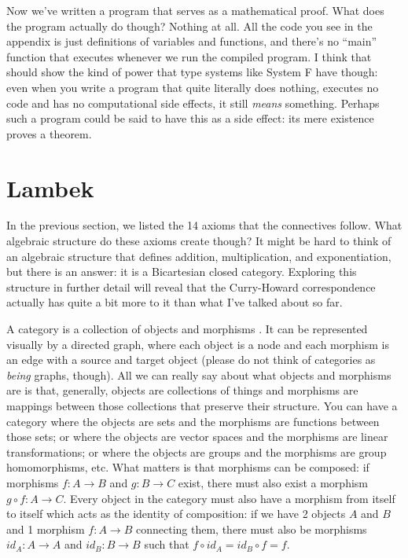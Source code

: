 \documentclass[12pt]{article}
\begin{document}
Now we've written a program that serves as a mathematical proof. What does the program actually do though? Nothing at all. All the code you see in the appendix is just definitions of variables and functions, and there's no ``main'' function that executes whenever we run the compiled program. I think that should show the kind of power that type systems like System F have though: even when you write a program that quite literally does nothing, executes no code and has no computational side effects, it still \textit{means} something. Perhaps such a program could be said to have this as a side effect: its mere existence proves a theorem.

\section{Lambek}

In the previous section, we listed the 14 axioms that the connectives follow. What algebraic structure do these axioms create though? It might be hard to think of an algebraic structure that defines addition, multiplication, and exponentiation, but there is an answer: it is a Bicartesian closed category. Exploring this structure in further detail will reveal that the Curry-Howard correspondence actually has quite a bit more to it than what I've talked about so far.

A category is a collection of objects and morphisms \cite{asperti}. It can be represented visually by a directed graph, where each object is a node and each morphism is an edge with a source and target object (please do not think of categories as \textit{being} graphs, though). All we can really say about what objects and morphisms are is that, generally, objects are collections of things and morphisms are mappings between those collections that preserve their structure. You can have a category where the objects are sets and the morphisms are functions between those sets; or where the objects are vector spaces and the morphisms are linear transformations; or where the objects are groups and the morphisms are group homomorphisms, etc. What matters is that morphisms can be composed: if morphisms $f: A \to B$ and $g: B \to C$ exist, there must also exist a morphism $g \circ f: A \to C$. Every object in the category must also have a morphism from itself to itself which acts as the identity of composition: if we have 2 objects $A$ and $B$ and 1 morphism $f: A \to B$ connecting them, there must also be morphisms $id_A: A \to A$ and $id_B: B \to B$ such that $f \circ id_A = id_B \circ f = f$.
\end{document}
